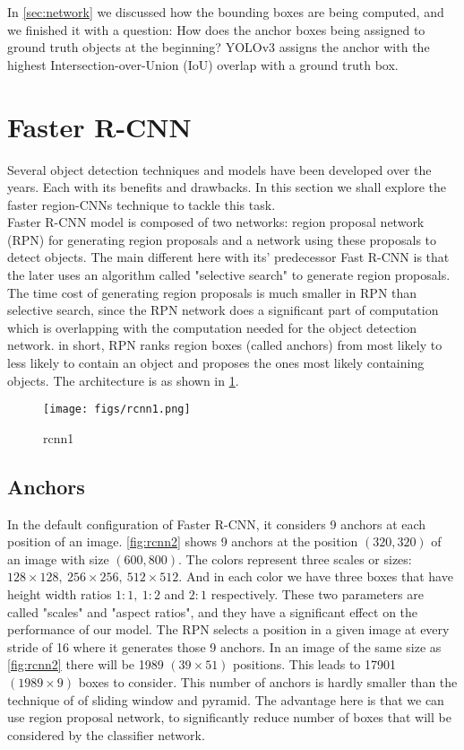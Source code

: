 In \cref{sec:network} we discussed how the bounding boxes are being computed, and we finished it with a question: How does the anchor boxes being
assigned to ground truth objects at the beginning? YOLOv3 assigns the anchor with the highest Intersection-over-Union (IoU) overlap with a ground
truth box.

\section{Faster R-CNN}
Several object detection techniques and models have been developed over the years. Each with its benefits and drawbacks. In this section we shall explore the faster region-CNNs technique to tackle this task. \\

Faster R-CNN model is composed of two networks: region proposal network (RPN) for generating region proposals and a network using these proposals to detect objects. The main different here with its' predecessor Fast R-CNN is that the later uses an algorithm called "selective search" to generate region proposals. The time cost of generating region proposals is much smaller in RPN than selective search, since the RPN network does a significant part of computation which is overlapping  with the computation needed for the  object detection network. in short, RPN ranks region boxes (called anchors) from most likely to less likely to contain an object and proposes the ones most likely containing objects. The architecture is as shown in  \cref{fig:rcnn1}.

\begin{figure}[H]
	\centering
	\texttt{[image: figs/rcnn1.png]}
	\caption{rcnn1}\label{fig:rcnn1}
\end{figure}

\subsection{Anchors}
In the default configuration of Faster R-CNN, it considers 9 anchors at each position of an image. \cref{fig:rcnn2} shows 9 anchors at the position $(320, 320)$ of an image with size $(600, 800)$. The colors represent three scales or sizes: $128 \times 128,\ 256 \times 256,\ 512 \times 512$. And in each color we have three boxes that have height width ratios $1:1,\ 1:2$ and $2:1$ respectively. These two parameters are called "scales" and "aspect ratios", and they have a significant effect on the performance of our model.
The RPN selects a position in a given image at every stride of 16 where it generates those 9 anchors. In an image of the same size as \cref{fig:rcnn2}  there will be 1989 $(39 \times 51)$ positions. This leads to 17901 $(1989 \times 9)$ boxes to consider. This number of anchors is hardly smaller than the technique of of sliding window and pyramid. The advantage here is that we can use region proposal network, to significantly reduce number of boxes that will be considered by the classifier network.


